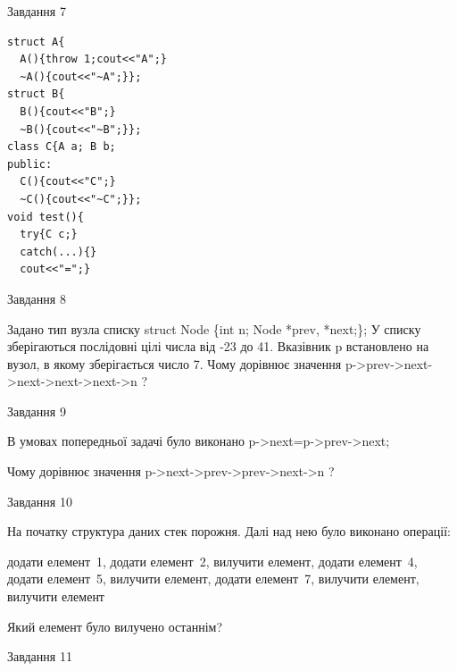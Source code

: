 \documentclass[12pt, ukrainian]{article}
\begin{document}
{{{{{{{{{{\begin{minipage}[t]{7cm}
               
{\begin{center}Завдання {7}\end{center}}
\vspace{-6mm}

\begin{verbatim}
struct A{
  A(){throw 1;cout<<"A";}
  ~A(){cout<<"~A";}};
struct B{
  B(){cout<<"B";}
  ~B(){cout<<"~B";}};
class C{A a; B b;
public:
  C(){cout<<"C";}
  ~C(){cout<<"~C";}};
void test(){
  try{C c;} 
  catch(...){} 
  cout<<"=";}
\end{verbatim}            


\end{minipage}
               
{\begin{center}Завдання {8}\end{center}}
\vspace{-6mm}
Задано тип вузла списку
struct Node \{int n; Node *prev, *next;\};
У списку зберігаються послідовні цілі числа від -23 до 41. Вказівник p встановлено на вузол, в якому зберігається число 7.
Чому дорівнює значення p->prev->next->next->next->next->n ?\par

               
{\begin{center}Завдання {9}\end{center}}
\vspace{-6mm}
В умовах попередньої задачі було виконано p->next=p->prev->next;

Чому дорівнює значення p->next->prev->prev->next->n ?\par

\newpage
               
{\begin{center}Завдання {10}\end{center}}
\vspace{-6mm}
На початку структура даних стек порожня. Далі над нею було виконано операції:

додати елемент~1, додати елемент~2, вилучити елемент, додати елемент~4, додати елемент~5, вилучити елемент, додати елемент~7, вилучити елемент, вилучити елемент

Який елемент було вилучено останнім?\par

               
{\begin{center}Завдання {11}\end{center}}
\vspace{-6mm}

}}}}}}}}}}
\end{document}
